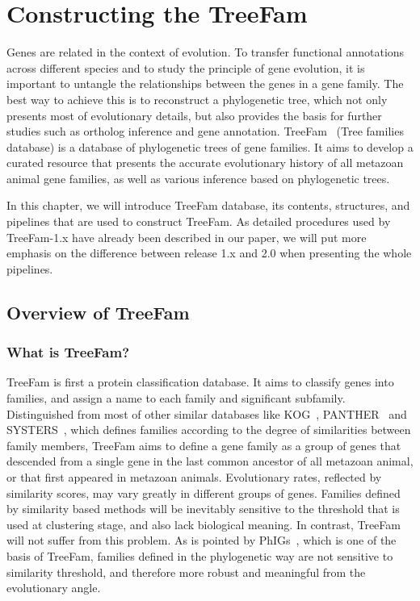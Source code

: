 \chapter{Constructing the TreeFam} \label{chap:treefam}

Genes are related in the context of evolution.
To transfer functional annotations across different species
and to study the principle of gene evolution, it is important
to untangle the relationships between the genes in a gene family. The best
way to achieve this is to reconstruct a phylogenetic tree, which
not only presents most of evolutionary details, but also provides
the basis for further studies such as ortholog inference and
gene annotation. TreeFam~\cite{li06} (Tree families database)
is a database of phylogenetic trees of gene families. It aims
to develop a curated resource that presents the accurate evolutionary
history of all metazoan animal gene families, as well as various inference 
based on phylogenetic trees.

In this chapter, we will introduce TreeFam database, its contents,
structures, and pipelines that are used to construct TreeFam.
As detailed procedures used by TreeFam-1.x have already been described
in our paper, we will put more emphasis on the difference between
release 1.x and 2.0 when presenting the whole pipelines.

\section{Overview of TreeFam}
\subsection{What is TreeFam?}
TreeFam is first a protein classification database. It aims to classify
genes into families, and assign a name to each family and significant
subfamily. Distinguished from most of other similar databases like
KOG~\cite{tatusov03}, PANTHER~\cite{mi05} and SYSTERS~\cite{meinel05}, which defines families according to the degree
of similarities between family members, TreeFam aims to define a gene
family as a group of genes that descended from a single gene in
the last common ancestor of all metazoan animal, or that first appeared in metazoan animals.
Evolutionary rates, reflected by similarity scores, may vary greatly in different
groups of genes. Families defined by similarity based methods
will be inevitably sensitive to the threshold that is used at clustering stage,
and also lack biological meaning.
In contrast, TreeFam will not suffer from this problem. As is pointed by
PhIGs~\cite{dehal05}, which is one of the basis of TreeFam, families defined in the phylogenetic way
are not sensitive to similarity threshold, and therefore more
robust and meaningful from the evolutionary angle.

